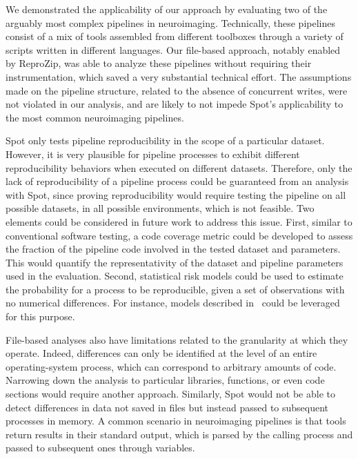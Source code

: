 \documentclass[a4paper,num-refs]{oup-contemporary}
\newcommand{\revised}[1]{\color{blue}#1\color{black}\xspace}
\newcommand{\reprozip}[0]{ReproZip\xspace}
\newcommand{\toolname}[0]{Spot\xspace}
\begin{document}
We demonstrated the applicability of our approach by evaluating two of the
arguably most complex pipelines in neuroimaging. Technically, these
pipelines consist of a mix of tools assembled from different toolboxes
through a variety of scripts written in different languages. Our file-based
approach, notably enabled by \reprozip, was able to analyze these pipelines
without requiring their instrumentation, which saved a very substantial
technical effort. The assumptions made on the pipeline structure, related
to the absence of concurrent writes, were not violated in our analysis, and
are likely to not impede \toolname's applicability to the most common
neuroimaging pipelines.

\revised{
\toolname only tests pipeline reproducibility in the scope of a particular dataset. However, it is very plausible 
for pipeline processes to exhibit different reproducibility behaviors when executed on different datasets. 
Therefore, only the lack of reproducibility of a pipeline process could be guaranteed from an analysis with \toolname, 
since proving reproducibility would require testing the pipeline on all possible datasets, in all possible environments, 
which is not feasible. Two elements could be considered in future work to address this issue. 
First, similar to conventional software testing, a code coverage metric could be developed to assess 
the fraction of the pipeline code involved in the tested dataset and parameters. This would quantify 
the representativity of the dataset and pipeline parameters used in the evaluation. Second, statistical 
risk models could be used to estimate the probability for a process to be reproducible, given a set of 
observations with no numerical differences. For instance, models described in~\cite{beauzamy2004methodes} 
could be leveraged for this purpose.}

File-based analyses also have limitations related to the
granularity at which they operate. Indeed, differences can only be
identified at the level of an entire operating-system process, which can
correspond to arbitrary amounts of code. Narrowing down the analysis to
particular libraries, functions, or even code sections would require
another approach. Similarly, \toolname would not be able to detect
differences in data not saved in files but instead passed to subsequent processes
in memory. A common scenario in neuroimaging pipelines is that tools return
results in their standard output, which is parsed by the calling process
and passed to subsequent ones through variables.
\end{document}
